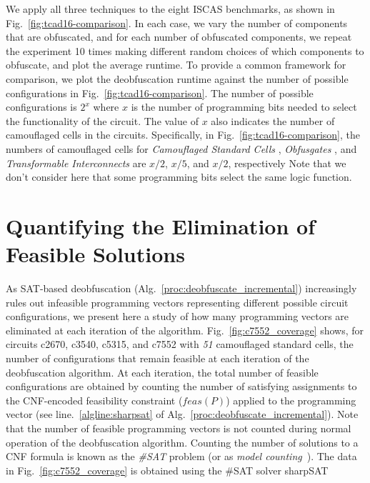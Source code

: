 \documentclass[proposal]{umassthesis}  %
\begin{document}
We apply all three techniques to the eight ISCAS benchmarks, as shown in Fig.~\ref{fig:tcad16-comparison}. In each case, we vary the number of components that are obfuscated, and for each number of obfuscated components, we repeat the experiment 10 times making different random choices of which components to obfuscate, and plot the average runtime. To provide a common framework for comparison, we plot the deobfuscation runtime against the number of possible configurations in Fig.~\ref{fig:tcad16-comparison}. The number of possible configurations is $2^x$ where $x$ is the number of programming bits needed to select the functionality of the circuit. {The value of $x$ also indicates the number of camouflaged cells in the circuits. Specifically, in Fig.~\ref{fig:tcad16-comparison}, the numbers of camouflaged cells for \textit{Camouflaged Standard Cells} \cite{rajendran-13}, \textit{Obfusgates} \cite{malik-obfusgate}, and \textit{Transformable Interconnects} \cite{chen-2015-dummyWire} are $x/2$, $x/5$, and $x/2$, respectively} Note that we don't consider here that some programming bits select the same logic function. 











\section{Quantifying the Elimination of Feasible Solutions}
As SAT-based deobfuscation (Alg.~\ref{proc:deobfuscate_incremental}) increasingly rules out infeasible programming vectors representing different possible circuit configurations, we present here a study of how many programming vectors are eliminated at each iteration of the algorithm. Fig.~\ref{fig:c7552_coverage} shows, for circuits c2670, c3540, c5315, and c7552 with \textit{51} camouflaged standard cells, the number of configurations that remain feasible at each iteration of the deobfuscation algorithm. At each iteration, the total number of feasible configurations are obtained by counting the number of satisfying assignments to the CNF-encoded feasibility constraint ($feas(P)$) applied to the programming vector (see line.~\ref{algline:sharpsat} of Alg.~\ref{proc:deobfuscate_incremental}). Note that the number of feasible programming vectors is not counted during normal operation of the deobfuscation algorithm. Counting the number of solutions to a CNF formula is known as the \textit{\#SAT} problem (or as \textit{model counting}~\cite{birnbaum1999good}). The data in Fig.~\ref{fig:c7552_coverage} is obtained using the \#SAT solver sharpSAT~\cite{thurley2006sharpsat}
\end{document}
